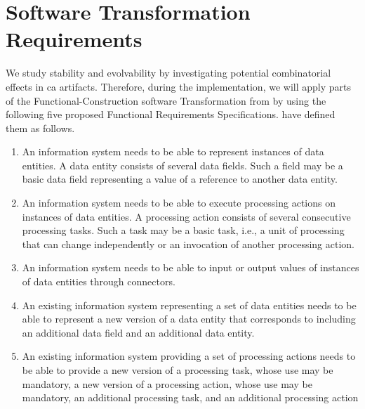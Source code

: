 \section{Software Transformation Requirements} \label{sec_requirements_transformation}

We study stability and evolvability by investigating potential combinatorial effects in
\gls{ca} artifacts. Therefore, during the implementation, we will apply parts of the
Functional-Construction software Transformation from
\textcite[251]{mannaert_normalized_2016} by using the following five proposed Functional
Requirements Specifications. \textcite[254-261]{mannaert_normalized_2016} have defined
them as follows.

\begin{enumerate}[leftmargin=*]
    \item An information system needs to be able to represent instances of
    data entities. A data entity consists of several data fields. Such a field may be a basic
    data field representing a value of a reference to another data entity.
    
    \item An information system needs to be able to execute processing actions on
    instances of data entities. A processing action consists of several consecutive processing
    tasks. Such a task may be a basic task, i.e., a unit of processing that can change
    independently or an invocation of another processing action.
    
    \item An information system needs to be able to input or output values
    of instances of data entities through connectors.
    
    \item An existing information system representing a set of data entities needs to be
    able to represent a new version of a data entity that corresponds to including an
    additional data field and an additional data entity.
    
    \item An existing information system providing a set of processing actions needs to
    be able to provide a new version of a processing task, whose use may be mandatory, a
    new version of a processing action, whose use may be mandatory, an additional
    processing task, and an additional processing action
    
\end{enumerate}